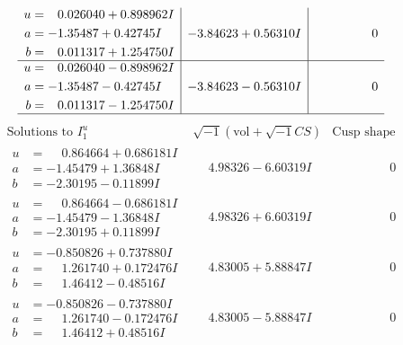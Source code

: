 \documentclass[1p]{elsarticle_modified}
\theoremstyle{definition}
\newcommand{\I}{\sqrt{-1}}
\begin{document}
$$\begin{array}{c|c|c}
\begin{aligned}
u &= \phantom{-}0.026040 + 0.898962 I \\
a &= -1.35487 + 0.42745 I \\
b &= \phantom{-}0.011317 + 1.254750 I\end{aligned}
 & -3.84623 + 0.56310 I & \phantom{-0.000000 } 0 \\ \hline\begin{aligned}
u &= \phantom{-}0.026040 - 0.898962 I \\
a &= -1.35487 - 0.42745 I \\
b &= \phantom{-}0.011317 - 1.254750 I\end{aligned}
 & -3.84623 - 0.56310 I & \phantom{-0.000000 } 0\\
 \hline 
 \end{array}$$\newpage$$\begin{array}{c|c|c}  
\text{Solutions to }I^u_{1}& \I (\text{vol} + \sqrt{-1}CS) & \text{Cusp shape}\\
 \hline 
\begin{aligned}
u &= \phantom{-}0.864664 + 0.686181 I \\
a &= -1.45479 + 1.36848 I \\
b &= -2.30195 - 0.11899 I\end{aligned}
 & \phantom{-}4.98326 - 6.60319 I & \phantom{-0.000000 } 0 \\ \hline\begin{aligned}
u &= \phantom{-}0.864664 - 0.686181 I \\
a &= -1.45479 - 1.36848 I \\
b &= -2.30195 + 0.11899 I\end{aligned}
 & \phantom{-}4.98326 + 6.60319 I & \phantom{-0.000000 } 0 \\ \hline\begin{aligned}
u &= -0.850826 + 0.737880 I \\
a &= \phantom{-}1.261740 + 0.172476 I \\
b &= \phantom{-}1.46412 - 0.48516 I\end{aligned}
 & \phantom{-}4.83005 + 5.88847 I & \phantom{-0.000000 } 0 \\ \hline\begin{aligned}
u &= -0.850826 - 0.737880 I \\
a &= \phantom{-}1.261740 - 0.172476 I \\
b &= \phantom{-}1.46412 + 0.48516 I\end{aligned}
 & \phantom{-}4.83005 - 5.88847 I & \phantom{-0.000000 } 0 \\ \hline\begin{aligned}

\end{aligned}
\end{array}$$
\end{document}
